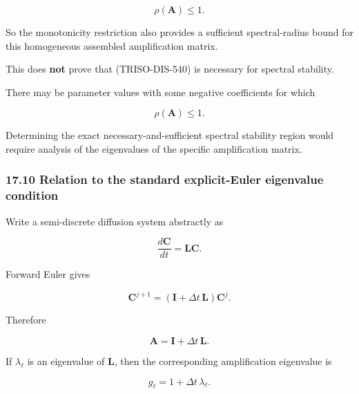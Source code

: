 \documentclass[11pt,a4paper]{article}
\begin{document}
\begin{equation}
\boxed{
\rho(\mathbf A)\le1.
}
\tag{TRISO-DIS-565}
\label{eq:triso-dis-565}
\end{equation}

So the monotonicity restriction also provides a sufficient spectral-radius bound for this homogeneous assembled amplification matrix.

This does \textbf{not} prove that (TRISO-DIS-540) is necessary for spectral stability.

There may be parameter values with some negative coefficients for which

\begin{equation}
\rho(\mathbf A)\le1.
\tag{TRISO-DIS-566}
\label{eq:triso-dis-566}
\end{equation}

Determining the exact necessary-and-sufficient spectral stability region would require analysis of the eigenvalues of the specific amplification matrix.

\subsubsection*{17.10 Relation to the standard explicit-Euler eigenvalue condition}

Write a semi-discrete diffusion system abstractly as

\begin{equation}
\frac{d\mathbf C}{dt}
=
\mathbf L\mathbf C.
\tag{TRISO-DIS-567}
\label{eq:triso-dis-567}
\end{equation}

Forward Euler gives

\begin{equation}
\mathbf C^{j+1}
=
\left(
\mathbf I+\Delta t\,\mathbf L
\right)
\mathbf C^j.
\tag{TRISO-DIS-568}
\label{eq:triso-dis-568}
\end{equation}

Therefore

\begin{equation}
\mathbf A
=
\mathbf I+\Delta t\,\mathbf L.
\tag{TRISO-DIS-569}
\label{eq:triso-dis-569}
\end{equation}

If $\lambda_\ell$ is an eigenvalue of $\mathbf L$, then the corresponding amplification eigenvalue is

\begin{equation}
g_\ell
=
1+\Delta t\,\lambda_\ell.
\tag{TRISO-DIS-570}
\label{eq:triso-dis-570}
\end{equation}
\end{document}
